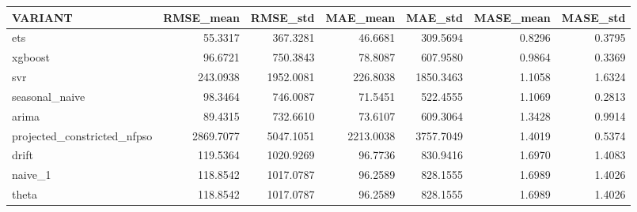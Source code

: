 \begin{tabular}{lrrrrrr}
\toprule
VARIANT & RMSE_mean & RMSE_std & MAE_mean & MAE_std & MASE_mean & MASE_std \\
\midrule
ets & 55.3317 & 367.3281 & 46.6681 & 309.5694 & 0.8296 & 0.3795 \\
xgboost & 96.6721 & 750.3843 & 78.8087 & 607.9580 & 0.9864 & 0.3369 \\
svr & 243.0938 & 1952.0081 & 226.8038 & 1850.3463 & 1.1058 & 1.6324 \\
seasonal_naive & 98.3464 & 746.0087 & 71.5451 & 522.4555 & 1.1069 & 0.2813 \\
arima & 89.4315 & 732.6610 & 73.6107 & 609.3064 & 1.3428 & 0.9914 \\
projected_constricted_nfpso & 2869.7077 & 5047.1051 & 2213.0038 & 3757.7049 & 1.4019 & 0.5374 \\
drift & 119.5364 & 1020.9269 & 96.7736 & 830.9416 & 1.6970 & 1.4083 \\
naive_1 & 118.8542 & 1017.0787 & 96.2589 & 828.1555 & 1.6989 & 1.4026 \\
theta & 118.8542 & 1017.0787 & 96.2589 & 828.1555 & 1.6989 & 1.4026 \\
\bottomrule
\end{tabular}
